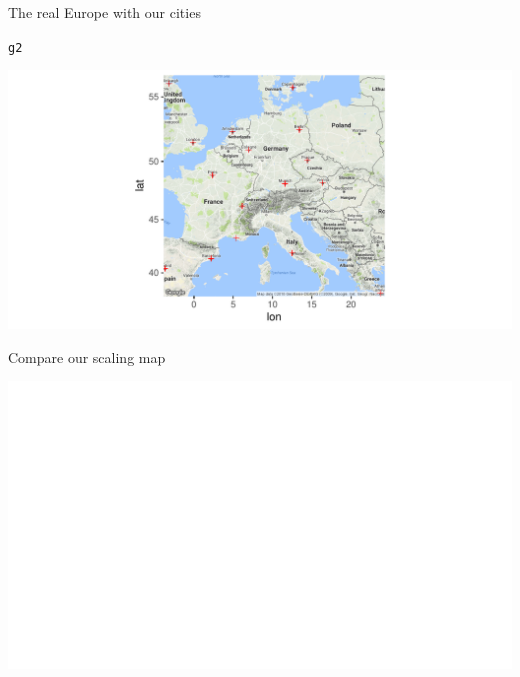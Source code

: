 \documentclass[unknownkeysallowed]{beamer}\usepackage[]{graphicx}\usepackage[]{color}
\makeatletter
\def\maxwidth{ %
  \ifdim\Gin@nat@width>\linewidth
    \linewidth
  \else
    \Gin@nat@width
  \fi
}
\newcommand{\hlstd}[1]{\textcolor[rgb]{0.345,0.345,0.345}{#1}}%
\newenvironment{kframe}{%
 \def\at@end@of@kframe{}%
 \ifinner\ifhmode%
  \def\at@end@of@kframe{\end{minipage}}%
  \begin{minipage}{\columnwidth}%
 \fi\fi%
 \def\FrameCommand##1{\hskip\@totalleftmargin \hskip-\fboxsep
 \colorbox{shadecolor}{##1}\hskip-\fboxsep
     \hskip-\linewidth \hskip-\@totalleftmargin \hskip\columnwidth}%
 \MakeFramed {\advance\hsize-\width
   \@totalleftmargin\z@ \linewidth\hsize
   \@setminipage}}%
 {\par\unskip\endMakeFramed%
 \at@end@of@kframe}
\newenvironment{knitrout}{}{} %
\makeatother
\begin{document}
\begin{frame}[fragile]{The real Europe with our cities}
  
\begin{knitrout}
\color{fgcolor}\begin{kframe}
\begin{alltt}
\hlstd{g2}
\end{alltt}
\end{kframe}
\includegraphics[width=\maxwidth]{figure/unnamed-chunk-397-1} 

\end{knitrout}
\end{frame}

\begin{frame}[fragile]{Compare our scaling map}
  
\begin{knitrout}
\color{fgcolor}\begin{kframe}


{\ttfamily\noindent\bfseries\color{errorcolor}{\#\# Error in FUN(X[[i]], ...): object 'city' not found}}\end{kframe}
\includegraphics[width=\maxwidth]{figure/unnamed-chunk-398-1} 

\end{knitrout}
  
\end{frame}
\end{document}
